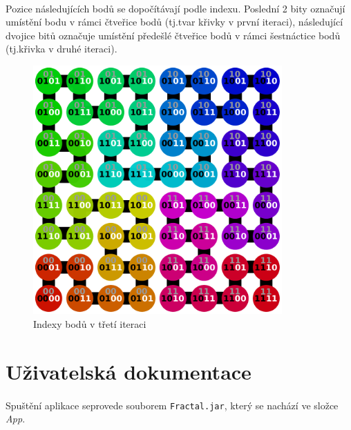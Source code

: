 \documentclass[12pt]{scrartcl}
\begin{document}
\paragraph{}
Pozice následujících bodů se dopočítávají podle indexu. Poslední 2 bity označují umístění bodu v rámci čtveřice bodů (tj.\nobreakspace tvar křivky v první iteraci), následující dvojice bitů označuje umístění předešlé čtveřice bodů v rámci šestnáctice bodů (tj.\nobreakspace křivka v druhé iteraci).

\begin{figure}[!ht]
	\centering
	\label{obr:polekolizi}
	\includegraphics[width=0.85\textwidth,natwidth=1,natheight=1]{hilbert.pdf}
	\caption{Indexy bodů v třetí iteraci}
\end{figure}

\newpage
\section{Uživatelská dokumentace}

\paragraph{}
Spuštění aplikace se\nobreakspace provede souborem \texttt{Fractal.jar}, který se nachází ve složce \emph{App}.
\end{document}
